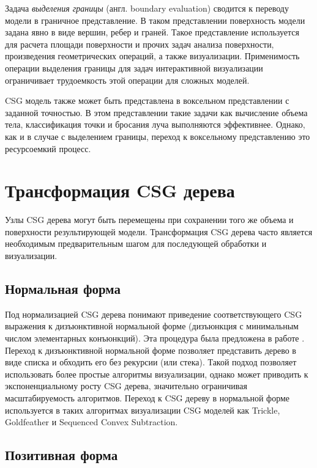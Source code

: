 Задача \textit{выделения границы} (англ. boundary evaluation) сводится к переводу модели в граничное представление. В таком представлении поверхность модели задана явно в виде вершин, ребер и граней. Такое представление используется для расчета площади поверхности и прочих задач анализа поверхности, произведения геометрических операций, а также визуализации. Применимость операции выделения границы для задач интерактивной визуализации ограничивает трудоемкость этой операции для сложных моделей.

CSG модель также может быть представлена в воксельном представлении с заданной точностью. В этом представлении такие задачи как вычисление объема тела, классификация точки и бросания луча выполняются эффективнее. Однако, как и в случае с выделением границы, переход к воксельному представлению это ресурсоемкий процесс.

\section{Трансформация CSG дерева} \label{sect_csg_transform}

Узлы CSG дерева могут быть перемещены при сохранении того же объема и поверхности результирующей модели. Трансформация CSG дерева часто является необходимым предварительным шагом для последующей обработки и визуализации.

\subsection{Нормальная форма} \label{sect_csg_normalization}

Под нормализацией CSG дерева понимают приведение соответствующего CSG выражения к дизъюнктивной нормальной форме (дизъюнкция с минимальным числом элементарных конъюнкций). Эта процедура была предложена в работе \cite{goldfeather1989near}. Переход к дизъюнктивной нормальной форме позволяет представить дерево в виде списка и обходить его без рекурсии (или стека). Такой подход позволяет использовать более простые алгоритмы визуализации, однако может приводить к экспоненциальному росту CSG дерева, значительно ограничивая  масштабируемость алгоритмов. Переход к CSG дереву в нормальной форме используется в таких алгоритмах визуализации CSG моделей как Trickle, Goldfeather и Sequenced Convex Subtraction.

\subsection{Позитивная форма} \label{sect_csg_positive_form}

